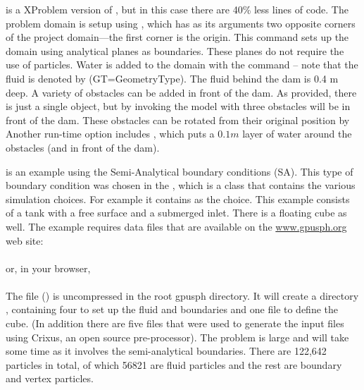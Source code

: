 \documentclass{../GPUSPHtemplate}
\begin{document}
 is a XProblem version of , 
but in this case there are 40\%  less lines of code.   
The problem domain is setup using , 
which has as its arguments two opposite corners of the 
project domain—the first corner is the origin. 
This command sets up the domain using analytical planes as boundaries. 
These planes do not require the use of particles.  
Water is added to the domain with the  command -- 
note that the fluid is denoted by   (GT=GeometryType).  
The fluid behind the dam is 0.4 m deep.  
A variety of obstacles can be added in front of the dam.  
As provided, there is just a single object, but by invoking the model with
three obstacles will be in front of the dam.  
These obstacles can be rotated from their original position 
by \\

Another run-time option includes , 
which puts a $0.1m$ layer of water around the obstacles (and in front of the dam).  


 is an example using the Semi-Analytical boundary conditions (SA). 
This type of boundary condition was chosen in the  , 
which is a class that contains the various simulation choices. 
For example it contains  as the choice.   
This example consists of a tank with a free surface and a submerged inlet.  
There is a floating cube as well.  
The example requires data files that are available on the \url{www.gpusph.org} web site:\\
\\

or, in your browser,\\
\\

The file () is uncompressed 
in the root gpusph directory.  
It will create a directory , containing four  
to set up the fluid and boundaries and one  file to define the cube.  
(In addition there are five files that were used to generate the input files 
using Crixus, an open source pre-processor).  
The problem is large and will take some time as it involves the semi-analytical boundaries.  
There are 122,642 particles in total, of which 56821 are fluid particles 
and the rest are boundary and vertex particles.  
\end{document}

